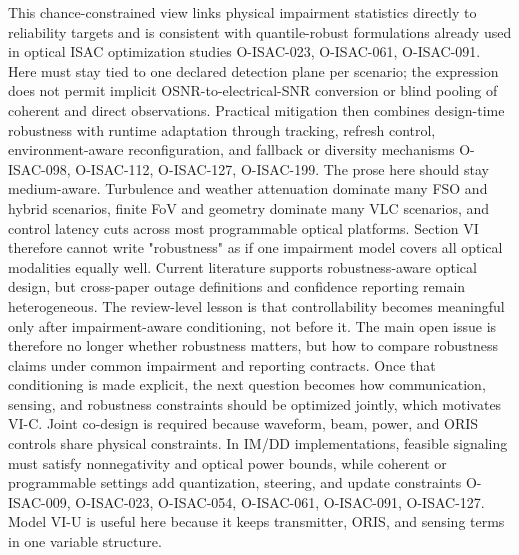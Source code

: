 {}\markdownRendererSoftLineBreak
{}\markdownRendererParagraphSeparator
{}This chance-constrained view links physical impairment statistics directly to reliability targets and is consistent with quantile-robust formulations already used in optical ISAC optimization studies O-ISAC-023, O-ISAC-061, O-ISAC-091. Here \markdownRendererInlineMath{\gamma} must stay tied to one declared detection plane per scenario; the expression does not permit implicit OSNR-to-electrical-SNR conversion or blind pooling of coherent and direct observations. Practical mitigation then combines design-time robustness with runtime adaptation through tracking, refresh control, environment-aware reconfiguration, and fallback or diversity mechanisms O-ISAC-098, O-ISAC-112, O-ISAC-127, O-ISAC-199.\markdownRendererParagraphSeparator
{}The prose here should stay medium-aware. Turbulence and weather attenuation dominate many FSO and hybrid scenarios, finite FoV and geometry dominate many VLC scenarios, and control latency cuts across most programmable optical platforms. Section VI therefore cannot write "robustness" as if one impairment model covers all optical modalities equally well.\markdownRendererParagraphSeparator
{} Current literature supports robustness-aware optical design, but cross-paper outage definitions and confidence reporting remain heterogeneous. The review-level lesson is that controllability becomes meaningful only after impairment-aware conditioning, not before it. The main open issue is therefore no longer whether robustness matters, but how to compare robustness claims under common impairment and reporting contracts. Once that conditioning is made explicit, the next question becomes how communication, sensing, and robustness constraints should be optimized jointly, which motivates VI-C.\markdownRendererInterblockSeparator
{}
\markdownRendererSectionEnd \markdownRendererSectionBegin
{}\markdownRendererInterblockSeparator
{}Joint co-design is required because waveform, beam, power, and ORIS controls share physical constraints. In IM/DD implementations, feasible signaling must satisfy nonnegativity and optical power bounds, while coherent or programmable settings add quantization, steering, and update constraints O-ISAC-009, O-ISAC-023, O-ISAC-054, O-ISAC-061, O-ISAC-091, O-ISAC-127. Model VI-U is useful here because it keeps transmitter, ORIS, and sensing terms in one variable structure.\markdownRendererParagraphSeparator
